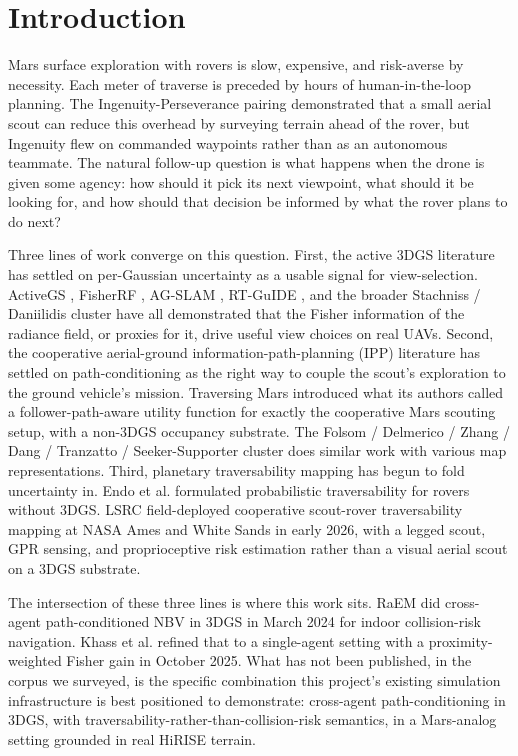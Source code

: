 \documentclass[conference]{IEEEtran}
\begin{document}
\section{Introduction}
Mars surface exploration with rovers is slow, expensive, and risk-averse by necessity. Each meter of traverse is preceded by hours of human-in-the-loop planning. The Ingenuity-Perseverance pairing demonstrated that a small aerial scout can reduce this overhead by surveying terrain ahead of the rover, but Ingenuity flew on commanded waypoints rather than as an autonomous teammate. The natural follow-up question is what happens when the drone is given some agency: how should it pick its next viewpoint, what should it be looking for, and how should that decision be informed by what the rover plans to do next?

Three lines of work converge on this question. First, the active 3DGS literature has settled on per-Gaussian uncertainty as a usable signal for view-selection. ActiveGS \cite{activegs}, FisherRF \cite{fisherrf}, AG-SLAM \cite{agslam}, RT-GuIDE \cite{rtguide}, and the broader Stachniss / Daniilidis cluster have all demonstrated that the Fisher information of the radiance field, or proxies for it, drive useful view choices on real UAVs. Second, the cooperative aerial-ground information-path-planning (IPP) literature has settled on path-conditioning as the right way to couple the scout's exploration to the ground vehicle's mission. Traversing Mars \cite{traversingmars} introduced what its authors called a follower-path-aware utility function for exactly the cooperative Mars scouting setup, with a non-3DGS occupancy substrate. The Folsom / Delmerico / Zhang / Dang / Tranzatto / Seeker-Supporter \cite{seekersupporter} cluster does similar work with various map representations. Third, planetary traversability mapping has begun to fold uncertainty in. Endo et al. \cite{endo} formulated probabilistic traversability for rovers without 3DGS. LSRC \cite{lsrc} field-deployed cooperative scout-rover traversability mapping at NASA Ames and White Sands in early 2026, with a legged scout, GPR sensing, and proprioceptive risk estimation rather than a visual aerial scout on a 3DGS substrate.

The intersection of these three lines is where this work sits. RaEM \cite{raem} did cross-agent path-conditioned NBV in 3DGS in March 2024 for indoor collision-risk navigation. Khass et al. \cite{khass} refined that to a single-agent setting with a proximity-weighted Fisher gain in October 2025. What has not been published, in the corpus we surveyed, is the specific combination this project's existing simulation infrastructure is best positioned to demonstrate: cross-agent path-conditioning in 3DGS, with traversability-rather-than-collision-risk semantics, in a Mars-analog setting grounded in real HiRISE terrain.
\end{document}
